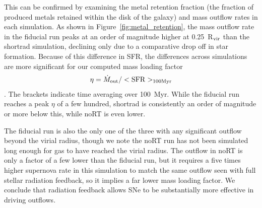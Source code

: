 \documentclass[twocolumn]{aastex62}
\begin{document}
This can be confirmed by examining the metal retention fraction (the fraction of produced metals retained within the disk of the galaxy) and mass outflow rates in each simulation. As shown in Figure~\ref{fig:metal_retention}, the mass outflow rate in the fiducial run peaks at an order of magnitude higher at 0.25~R$_{\rm vir}$ than the shortrad simulation, declining only due to a comparative drop off in star formation. Because of this difference in SFR, 
the differences across simulations are more significant for our computed mass loading factor 
\begin{equation}
    \eta = \dot{M}_{\rm out} / <\rm{SFR}>_{100 \rm{Myr}}
\end{equation}. The brackets indicate time averaging over 100~Myr.
%
While the fiducial run reaches a peak $\eta$ of a few hundred, shortrad is consistently an order of magnitude or more below this, while noRT is even lower. 

The fiducial run is also the only one of the three with any significant outflow beyond the virial radius, though we note the noRT run has not been simulated long enough for gas to have reached the virial radius. The outflow in noRT is 
   only a factor of a few lower than 
the fiducial run, but it requires a five times higher supernova rate in this simulation to match the same outflow seen with full stellar radiation feedback, 
    so it implies a far lower mass loading factor. 
We conclude that radiation feedback allows SNe to be substantially more effective in driving outflows. 
\end{document}
